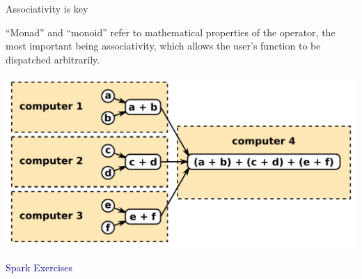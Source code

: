 \documentclass{beamer}
\begin{document}
\begin{frame}{Associativity is key}

``Monad'' and ``monoid'' refer to mathematical properties of the operator, the most important being associativity, which allows the user's function to be dispatched arbitrarily.

\begin{center}
\includegraphics[width=0.7\linewidth]{monoids.pdf}
\end{center}
\end{frame}








\begin{frame}{}
\begin{center}
\Huge \textcolor{darkblue}{Spark Exercises}
\end{center}
\end{frame}
\end{document}
